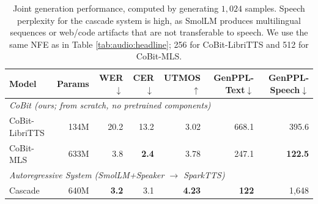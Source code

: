 \begin{table}[t]
\centering
\small
\setlength{\tabcolsep}{4.5pt}
\begin{tabular}{lrrrrrr}
\toprule
\textbf{Model} & \textbf{Params} & \textbf{WER}$\downarrow$ & \textbf{CER}$\downarrow$ & \textbf{UTMOS}$\uparrow$ & \textbf{GenPPL-Text}$\downarrow$ & \textbf{GenPPL-Speech}$\downarrow$ \\
\midrule
\multicolumn{7}{l}{\emph{CoBit (ours; from scratch, no pretrained components)}} \\
CoBit-LibriTTS & 134M & 20.2 & 13.2 & 3.02 & 668.1 & 395.6 \\
CoBit-MLS & 633M & 3.8 & \textbf{2.4} & 3.78 & 247.1 & \textbf{122.5} \\
\midrule
\multicolumn{7}{l}{\emph{Autoregressive System (SmolLM+Speaker $\rightarrow$ SparkTTS)}} \\
Cascade & 640M & \textbf{3.2} & 3.1 & \textbf{4.23} & \textbf{122} & 1{,}648 \\
\bottomrule
\end{tabular}
\caption{Joint generation performance, computed by generating $1,024$ samples. Speech perplexity for the cascade system is high, as SmolLM produces multilingual sequences or web/code artifacts that are not transferable to speech. We use the same NFE as in Table \ref{tab:audio:headline}; 256 for CoBit-LibriTTS and 512 for CoBit-MLS.}
\label{tab:audio:joint}
\end{table}

